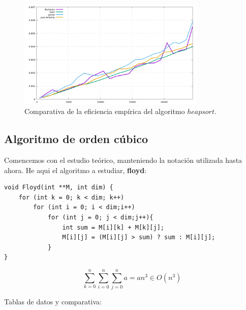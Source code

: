 \documentclass[11pt,a4paper]{article}
\begin{document}
\begin{figure}[H]
	\centering
	\includegraphics[width=0.8\textwidth]{../plots/heapsort}
	\caption{Comparativa de la eficiencia empírica del algoritmo $heapsort$.}
\end{figure}

\subsection{Algoritmo de orden cúbico}

Comencemos con el estudio teórico, manteniendo la notación utilizada hasta ahora. He aqui el algoritmo a estudiar, \textbf{floyd}:

\begin{lstlisting}
void Floyd(int **M, int dim) {
	for (int k = 0; k < dim; k++)
		for (int i = 0; i < dim;i++)
			for (int j = 0; j < dim;j++){
				int sum = M[i][k] + M[k][j];    	
				M[i][j] = (M[i][j] > sum) ? sum : M[i][j];
			}
}	     	
\end{lstlisting}

$$\sum_{k=0}^{n} \sum_{i=0}^{n} \sum_{j=0}^{n} a = a n^3 \in O(n^3)$$

Tablas de datos y comparativa:
\end{document}

